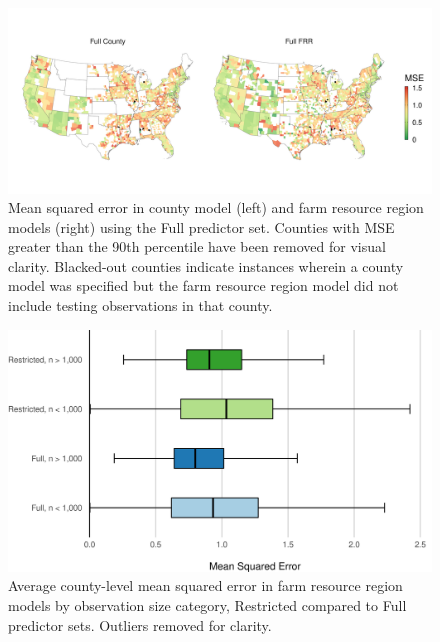 \documentclass[12pt]{article}
\begin{document}
\begin{figure}[H]
    \centering
    \includegraphics[width=1\textwidth]{exhibits/compare_ffb_fcb_mse.png}
    \caption{Mean squared error in county model (left) and farm resource region models (right) using the Full predictor set. Counties with MSE greater than the 90th percentile have been removed for visual clarity. Blacked-out counties indicate instances wherein a county model was specified but the farm resource region model did not include testing observations in that county.}
    \label{fig:compare_ffb_fcb_mse}
\end{figure}

\begin{figure}[H]
    \centering
    \includegraphics[width=1\textwidth]{exhibits/frr_compare_mse_size.png}
    \caption{Average county-level mean squared error in farm resource region models by observation size category, Restricted compared to Full predictor sets. Outliers removed for clarity.}
    \label{fig:frr_compare_mse_size}
\end{figure}
\end{document}
